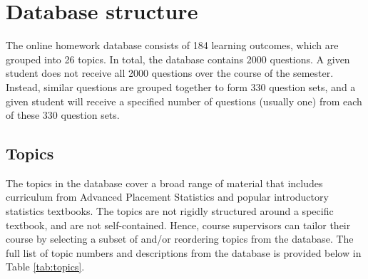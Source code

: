 \documentclass[11pt,a4paper,oldfontcommands,openany]{memoir}
\numberwithin{equation}{section} %
\begin{document}
\section{Database structure}

The online homework database consists of 184 learning outcomes, which are grouped into 26 topics. In total, the database contains 2000 questions. A given student does not receive all 2000 questions over the course of the semester. Instead, similar questions are grouped together to form 330 question sets, and a given student will receive a specified number of questions (usually one) from each of these 330 question sets.

\subsection{Topics}

The topics in the database cover a broad range of material that includes curriculum from Advanced Placement Statistics and popular introductory statistics textbooks. The topics are not rigidly structured around a specific textbook, and are not self-contained. Hence, course supervisors can tailor their course by selecting a subset of and/or reordering topics from the database. The full list of topic numbers and descriptions from the database is provided below in Table \ref{tab:topics}.
\end{document}
